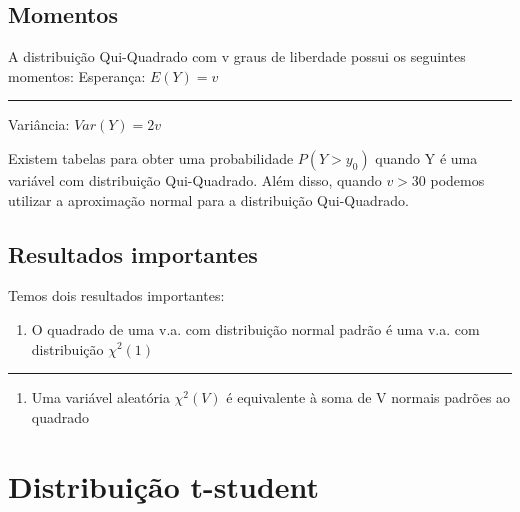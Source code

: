 \documentclass[
  letterpaper,
  DIV=11,
  numbers=noendperiod]{scrartcl}
\providecommand{\tightlist}{%
  \setlength{\itemsep}{0pt}\setlength{\parskip}{0pt}}
\begin{document}
\subsection{Momentos}\label{momentos-3}

\begin{definicao}

A distribuição Qui-Quadrado com v graus de liberdade possui os seguintes
momentos: Esperança: \(E(Y)=v\)

\begin{center}\rule{0.5\linewidth}{0.5pt}\end{center}

Variância: \(Var(Y)=2v\)

\end{definicao}

Existem tabelas para obter uma probabilidade \(P(Y>y_0)\) quando Y é uma
variável com distribuição Qui-Quadrado. Além disso, quando \(v>30\)
podemos utilizar a aproximação normal para a distribuição Qui-Quadrado.

\subsection{Resultados importantes}\label{resultados-importantes}

Temos dois resultados importantes:

\begin{definicao}

\begin{enumerate}
\def\labelenumi{(\arabic{enumi})}
\tightlist
\item
  O quadrado de uma v.a. com distribuição normal padrão é uma v.a. com
  distribuição \(\chi^{2}(1)\)
\end{enumerate}

\begin{center}\rule{0.5\linewidth}{0.5pt}\end{center}

\begin{enumerate}
\def\labelenumi{(\arabic{enumi})}
\setcounter{enumi}{1}
\tightlist
\item
  Uma variável aleatória \(\chi^{2}(V)\) é equivalente à soma de V
  normais padrões ao quadrado
\end{enumerate}

\end{definicao}

\section{Distribuição t-student}\label{distribuiuxe7uxe3o-t-student}
\end{document}
